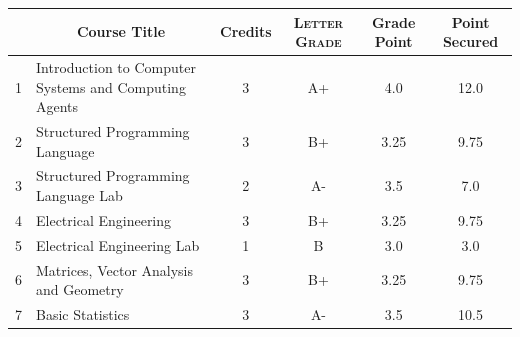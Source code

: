 \documentclass[11pt]{article}
\newcommand*{\numtwo}[1]{\pgfmathprintnumber[
                    fixed, precision=2, fixed zerofill=true]{#1}}
\begin{document}
                \begin{center}
                    \renewcommand{\arraystretch}{1.08}
                    
                \begin{tabular}{|c|l|c|>{\scshape}c|c|c|}
                \hline  \rule[-1ex]{0pt}{3.5ex} {\centering{\bf Course Code}} &  \multicolumn{1}{c|}{\textbf{Course Title}}  & {\bf Credits} & {\bf Letter Grade} & {\bf Grade Point} & {\bf Point Secured}  \\ 
                \hline   1 &  Introduction to Computer Systems and Computing Agents		 & 3 & A+ & 4.0 & 12.0 \\ %
                \hline   2 &  Structured Programming Language		 & 3 & B+ & 3.25 & 9.75 \\ %
                \hline   3 &  Structured Programming Language Lab		 & 2 & A- & 3.5 & 7.0 \\ %
                \hline   4 &  Electrical Engineering		 & 3 & B+ & 3.25 & 9.75 \\ %
                \hline   5 &  Electrical Engineering Lab		 & 1 & B & 3.0 & 3.0 \\ %
                \hline   6 &  Matrices, Vector Analysis and Geometry		 & 3 & B+ & 3.25 & 9.75 \\ %
                \hline   7 &  Basic Statistics		 & 3 & A- & 3.5 & 10.5 \\ %

\hline                %
                \end{tabular}
                \end{center}
                \renewcommand{\arraystretch}{1.03}
\end{document}
